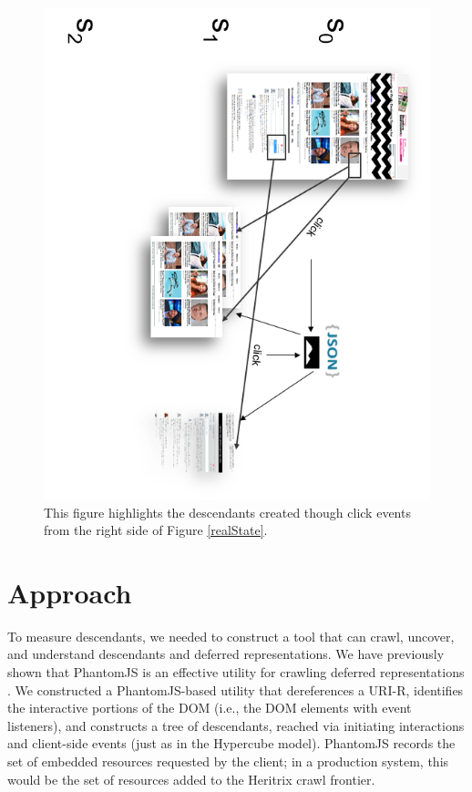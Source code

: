 \documentclass{sig-alternate}
\begin{document}
\begin{figure}
\centering
\includegraphics[height=0.98\textheight]{./imgs/realStates_rightH.png}
\caption{This figure highlights the descendants created though click events from the right side of Figure \ref{realState}.}
\label{realStateR}
\end{figure}




\section{Approach}
\label{approach}

To measure descendants, we needed to construct a tool that can crawl, uncover, and understand descendants and deferred representations. We have previously shown that PhantomJS is an effective utility for crawling deferred representations \cite{crawlingDeferred}. 
We constructed a PhantomJS-based utility that dereferences a URI-R, identifies the interactive portions of the DOM (i.e., the DOM elements with event listeners), and constructs a tree of descendants, reached via initiating interactions and client-side events (just as in the Hypercube model). PhantomJS records the set of embedded resources requested by the client; in a production system, this would be the set of resources added to the Heritrix crawl frontier.
\end{document}

